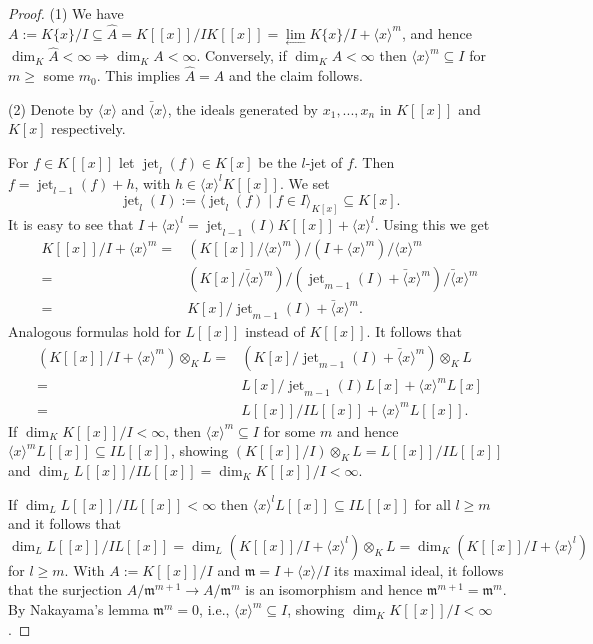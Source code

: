 \documentclass[10pt,a4paper]{amsart}
\DeclareMathOperator{\jet}{jet}
\def\x{\langle x \rangle}
\newcommand{\fm}{\mathfrak{m}}
\begin{document}
   \begin{proof}
(1) We have $A:=K\{x\}/I \subseteq \hat A =   K[[x]]/I K[[x]] = \lim\limits_{\longleftarrow} K\{x\}/I+\x^m$,  and hence 
$\dim_K \hat A  < \infty \Longrightarrow \dim_K A < \infty$.
Conversely, if $\dim_K A < \infty$ then $\x^m \subseteq I$ for  $m \ge$ some $m_0$. This implies $\hat A =A$ and the claim follows.

(2) Denote by $\x$ and $\bar \x$,  the ideals generated by $x_1,...,x_n$ in $K[[x]]$ and  $K[x]$ respectively.

For $f \in K[[x]]$ let $\jet_l(f) \in K[x]$ be the $l$-jet of $f$. Then
$f = \jet_{l-1}(f) +h$, with $h \in \x^l K[[x]]$. We set 
$$\jet_l(I):=  \langle\jet_l(f) \mid f \in I \rangle_ {K[x]} \subseteq K[x].$$
It is easy to see that $I + \x^l =\jet_{l-1}(I)K[[x]] + \x^l$. Using this we get
 \begin{align*}
K[[x]]/I+\x^m = & (K[[x]]/\x^m)/(I+\x^m)/\x^m \\
    =& (K[x]/\bar \x^m)/(\jet_{m-1}(I)+\bar\x^m)/\bar\x^m\\
    =& K[x]/ \jet_{m-1}(I) + \bar \x^m.
\end{align*}
Analogous formulas hold for $L[[x]]$ instead of $K[[x]]$. It follows that 
 \begin{align*}
(K[[x]]/I+\x^m)\otimes_K L
  =&(K[x]/ \jet_{m-1}(I) + \bar \x^m)\otimes_K L\\
 =& L[x]/ \jet_{m-1}(I)L[x] +  \x^m L[x]\\
  = & L[[x]]/ IL[[x]] +  \x^m L[[x]]. 
\end{align*}
If  $\dim_K K[[x]]/I <\infty$, then $\x^m \subseteq I$ for some $m$ and hence $\x^m L[[x]] \subseteq I L[[x]]$, showing 
$(K[[x]]/I)\otimes_K L =  L[[x]]/ IL[[x]]$ and
$\dim_L L[[x]]/I L[[x]] = \dim_K K[[x]]/I < \infty $.

If  $\dim_L L[[x]]/IL[[x]] <\infty$ then $\x^l L[[x]] \subseteq IL[[x]]$ for all
$l\ge m$ and it follows that $\dim_L L[[x]]/IL[[x]] = \dim_L (K[[x]]/I+\x^l)\otimes_K L = \dim_K(K[[x]]/I+\x^l)$ for $l\ge m$.
With $A:= K[[x]]/I$ and $\fm = I+\x/I$ its maximal ideal, it follows that
the surjection
$A/\fm^ {m+1} \to A/\fm^ {m}$ is an isomorphism and hence $\fm^ {m+1} = \fm^ {m}$. By Nakayama's lemma $\fm^ {m} =0 $, i.e., 
$\x^m \subseteq I$, showing  $\dim_K K[[x]]/I <\infty$.
 \end{proof}
\end{document}
